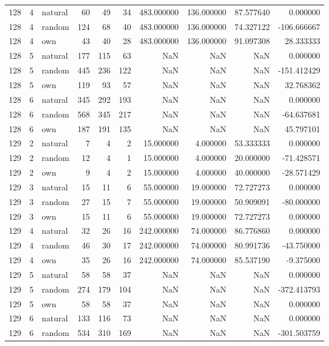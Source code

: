 \begin{table}[htbp]
\begin{tabular}{rrlrrrrrrr}
128 & 4 & natural & 60 & 49 & 34 & 483.000000 & 136.000000 & 87.577640 & 0.000000 \\
128 & 4 & random & 124 & 68 & 40 & 483.000000 & 136.000000 & 74.327122 & -106.666667 \\
128 & 4 & own & 43 & 40 & 28 & 483.000000 & 136.000000 & 91.097308 & 28.333333 \\
128 & 5 & natural & 177 & 115 & 63 & NaN & NaN & NaN & 0.000000 \\
128 & 5 & random & 445 & 236 & 122 & NaN & NaN & NaN & -151.412429 \\
128 & 5 & own & 119 & 93 & 57 & NaN & NaN & NaN & 32.768362 \\
128 & 6 & natural & 345 & 292 & 193 & NaN & NaN & NaN & 0.000000 \\
128 & 6 & random & 568 & 345 & 217 & NaN & NaN & NaN & -64.637681 \\
128 & 6 & own & 187 & 191 & 135 & NaN & NaN & NaN & 45.797101 \\
129 & 2 & natural & 7 & 4 & 2 & 15.000000 & 4.000000 & 53.333333 & 0.000000 \\
129 & 2 & random & 12 & 4 & 1 & 15.000000 & 4.000000 & 20.000000 & -71.428571 \\
129 & 2 & own & 9 & 4 & 2 & 15.000000 & 4.000000 & 40.000000 & -28.571429 \\
129 & 3 & natural & 15 & 11 & 6 & 55.000000 & 19.000000 & 72.727273 & 0.000000 \\
129 & 3 & random & 27 & 15 & 7 & 55.000000 & 19.000000 & 50.909091 & -80.000000 \\
129 & 3 & own & 15 & 11 & 6 & 55.000000 & 19.000000 & 72.727273 & 0.000000 \\
129 & 4 & natural & 32 & 26 & 16 & 242.000000 & 74.000000 & 86.776860 & 0.000000 \\
129 & 4 & random & 46 & 30 & 17 & 242.000000 & 74.000000 & 80.991736 & -43.750000 \\
129 & 4 & own & 35 & 26 & 16 & 242.000000 & 74.000000 & 85.537190 & -9.375000 \\
129 & 5 & natural & 58 & 58 & 37 & NaN & NaN & NaN & 0.000000 \\
129 & 5 & random & 274 & 179 & 104 & NaN & NaN & NaN & -372.413793 \\
129 & 5 & own & 58 & 58 & 37 & NaN & NaN & NaN & 0.000000 \\
129 & 6 & natural & 133 & 116 & 73 & NaN & NaN & NaN & 0.000000 \\
129 & 6 & random & 534 & 310 & 169 & NaN & NaN & NaN & -301.503759 \\

\end{tabular}
\end{table}
